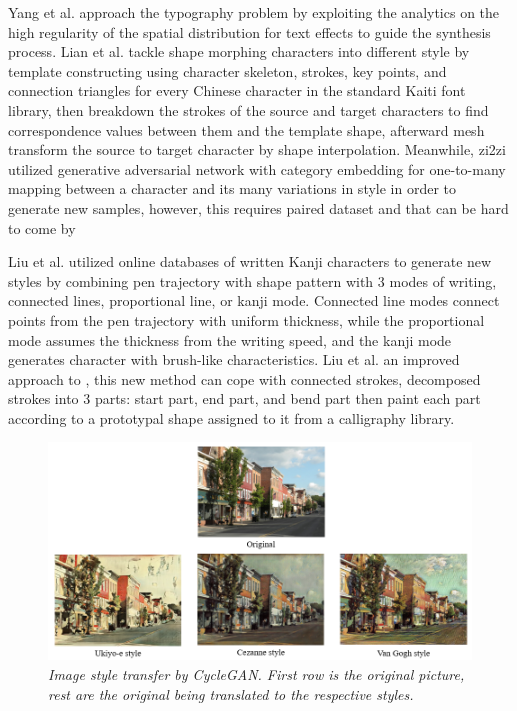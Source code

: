 \documentclass[12pt]{report}
\begin{document}
Yang et al.\cite{awesome-typography} approach the typography problem by exploiting the analytics on the
high regularity of the spatial distribution for text effects to guide the synthesis process. Lian et al.\cite{automatic-morphing} tackle shape morphing characters into different style by template constructing using character skeleton, strokes, key points, and connection triangles for every Chinese character in the standard Kaiti font library, then breakdown the strokes of the source and target characters to find correspondence values between them and the template shape, afterward mesh transform the source to target character by shape interpolation.
Meanwhile, zi2zi \cite{zi2zi} utilized generative adversarial network with category embedding for one-to-many mapping between a character and its many variations in style in order to generate new samples, however, this requires paired dataset and that can be hard to come by

Liu et al.\cite{online-kanji} utilized online databases of written Kanji characters to generate new styles by combining pen trajectory with shape pattern with 3 modes of writing, connected lines, proportional line, or kanji mode. Connected line modes connect points from the pen trajectory with uniform thickness, while the proportional mode assumes the thickness from the writing speed, and the kanji mode generates character with brush-like characteristics.
Liu et al.\cite{online-kanji-2} an improved approach to \cite{online-kanji}, this new method can cope with connected strokes, decomposed strokes into 3 parts: start part, end part, and bend part then paint each part according to a prototypal shape assigned to it from a calligraphy library.

\begin{figure}[h]
	\centering
	\includegraphics[scale=0.65]{style-transfer}
	\caption{\textit{Image style transfer by CycleGAN. First row is the original picture, rest are the original being translated to the respective styles.}}
	\label{fig:style-transfer}
\end{figure}
\end{document}
